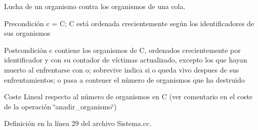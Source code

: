 Lucha de un organismo contra los organismos de una cola. 

\begin{DoxyPrecond}{Precondición}
c = C; C está ordenada crecientemente según los identificadores de sus organismos 
\end{DoxyPrecond}
\begin{DoxyPostcond}{Postcondición}
c contiene los organismos de C, ordenados crecientemente por identificador y con su contador de víctimas actualizado, excepto los que hayan muerto al enfrentarse con o; sobrevive indica si o queda vivo despues de sus enfrentamientos; o pasa a contener el número de organismos que ha destruido 
\end{DoxyPostcond}
\begin{DoxyParagraph}{Coste}
Lineal respecto al número de organismos en C (ver comentario en el coste de la operación \char`\"{}anadir\+\_\+organismo\char`\"{}) 
\end{DoxyParagraph}


Definición en la línea 29 del archivo Sistema.\+cc.


